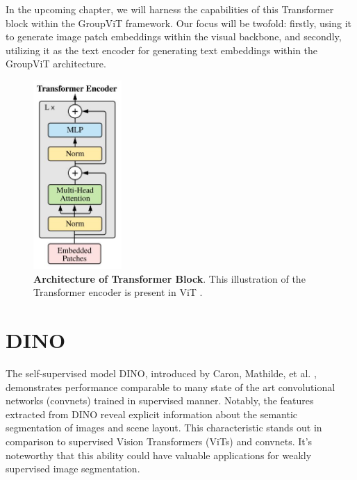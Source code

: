 In the upcoming chapter, we will harness the capabilities of this Transformer block within the GroupViT framework. Our focus will be twofold: firstly, using it to generate image patch embeddings within the visual backbone, and secondly, utilizing it as the text encoder for generating text embeddings within the GroupViT architecture.





\begin{figure}
  \centering
  \includegraphics[width=0.3\textwidth]{figures/experiments/figures/transformerblock.png}
  \caption[\textbf{Architecture of Transformer Block}]{\textbf{Architecture of Transformer Block}. This illustration of the Transformer encoder is present in ViT \cite{dosovitskiy2020image}.}
  \label{fig:inf}
\end{figure}

\section{DINO}
The self-supervised model DINO, introduced by Caron, Mathilde, et al. \cite{caron2021emerging}, demonstrates performance comparable to many state of the art convolutional networks (convnets) trained in supervised manner. Notably, the features extracted from DINO reveal explicit information about the semantic segmentation of images and scene layout. This characteristic stands out in comparison to supervised Vision Transformers (ViTs) and convnets. It's noteworthy that this ability could have valuable applications for weakly supervised image segmentation.
